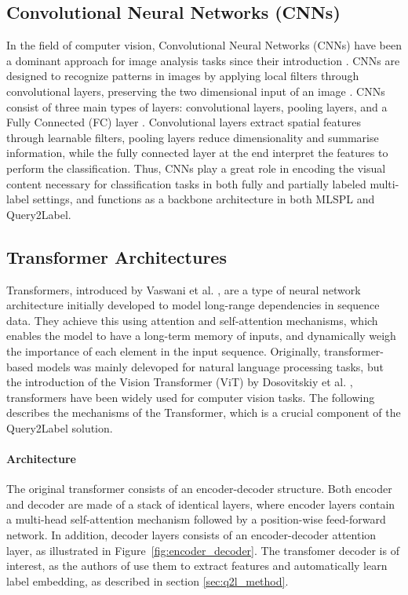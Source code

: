\documentclass[lettersize,journal]{IEEEtran}
\begin{document}
\subsection{Convolutional Neural Networks (CNNs)}
In the field of computer vision, Convolutional Neural Networks (CNNs) have been a dominant approach for image analysis tasks since their introduction \cite{lecun95}. CNNs are designed to recognize patterns in images by applying local filters through convolutional layers, preserving the two dimensional input of an image \cite{zhang2023dive}. CNNs consist of three main types of layers: convolutional layers, pooling layers, and a Fully Connected (FC) layer \cite{asawaCS231n}. Convolutional layers extract spatial features through learnable filters, pooling layers reduce dimensionality and summarise information, while the fully connected layer at the end interpret the features to perform the classification. Thus, CNNs play a great role in encoding the visual content necessary for classification tasks in both fully and partially labeled multi-label settings, and functions as a backbone architecture in both MLSPL and Query2Label.

\subsection{Transformer Architectures}
\label{sec:transformers}
Transformers, introduced by Vaswani et al. \cite{vaswani2023attentionneed}, are a type of neural network architecture initially developed to model long-range dependencies in sequence data. They achieve this using attention and self-attention mechanisms, which enables the model to have a long-term memory of inputs, and dynamically weigh the importance of each element in the input sequence. Originally, transformer-based models was mainly delevoped for natural language processing tasks, but the introduction of the Vision Transformer (ViT) by Dosovitskiy et al. \cite{dosovitskiy2021imageworth16x16words}, transformers have been widely used for computer vision tasks. The following describes the mechanisms of the Transformer, which is a crucial component of the Query2Label solution.


\paragraph{Architecture}
The original transformer consists of an encoder-decoder structure. Both encoder and decoder are made of a stack of identical layers, where encoder layers contain a multi-head self-attention mechanism followed by a position-wise feed-forward network. In addition, decoder layers consists of an encoder-decoder attention layer, as illustrated in Figure~\ref{fig:encoder_decoder}. The transfomer decoder is of interest, as the authors of \cite{Query2Label} use them to extract features and automatically learn label embedding, as described in section \ref{sec:q2l_method}.
\end{document}
